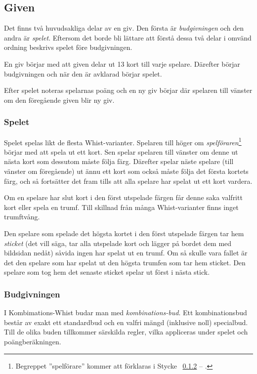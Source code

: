 \documentclass[a4paper]{article}
\renewcommand{\sectionref}[1]{%
	\ref{sec:#1} -- \nameref{sec:#1}%
}
\begin{document}
		\subsection{Given}
			Det finns två huvudsakliga delar av en giv. Den första är \emph{budgivningen} och den andra är \emph{spelet}. Eftersom det borde bli lättare att förstå dessa två delar i omvänd ordning beskrivs spelet före budgivningen.

			En giv börjar med att given delar ut 13 kort till varje spelare. Därefter börjar budgivningen och när den är avklarad börjar spelet.

			Efter spelet noteras spelarnas poäng och en ny giv börjar där spelaren till vänster om den föregående given blir ny giv.

			\subsubsection{Spelet}
				Spelet spelas likt de flesta Whist-varianter. Spelaren till höger om \emph{spelföraren}\footnote{Begreppet ''spelförare'' kommer att förklaras i Stycke~\sectionref{bidding}.} börjar med att spela ut ett kort. Sen spelar spelaren till vänster om denne ut nästa kort som dessutom måste följa färg. Därefter spelar näste spelare (till vänster om föregående) ut ännu ett kort som också måste följa det första kortets färg, och så fortsätter det fram tills att alla spelare har spelat ut ett kort vardera.

				Om en spelare har slut kort i den först utspelade färgen får denne saka valfritt kort eller spela en trumf. Till skillnad från många Whist-varianter finns inget trumftvång.

				Den spelare som spelade det högsta kortet i den först utspelade färgen tar hem \emph{sticket} (det vill säga, tar alla utspelade kort och lägger på bordet dem med bildsidan nedåt) såvida ingen har spelat ut en trumf. Om så skulle vara fallet är det den spelare som har spelat ut den högsta trumfen som tar hem sticket. Den spelare som tog hem det senaste sticket spelar ut först i nästa stick.

			\subsubsection{Budgivningen}
				\label{sec:bidding}
				I Kombimations-Whist budar man med \emph{kombinations-bud}. Ett kombinationsbud består av exakt ett standardbud och en valfri mängd (inklusive noll) specialbud. Till de olika buden tillkommer särskilda regler, vilka appliceras under spelet och poängberäkningen.
\end{document}
